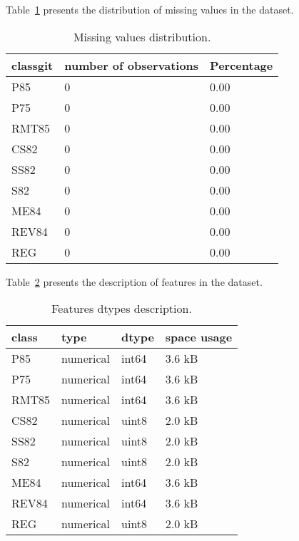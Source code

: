 \documentclass{article}%
\begin{document}
%
Table~\ref{tab:missing_values} %
presents the distribution of missing values in the dataset.%


\begin{table}[H]%
\begin{center}%
\renewcommand{\arraystretch}{1.5}%
\begin{tabular}{l l l}%
\hline%
\textbf{classgit}&\textbf{number of observations}&\textbf{Percentage}\\%
\hline%
P85&0&0.00\\%
P75&0&0.00\\%
RMT85&0&0.00\\%
CS82&0&0.00\\%
SS82&0&0.00\\%
S82&0&0.00\\%
ME84&0&0.00\\%
REV84&0&0.00\\%
REG&0&0.00\\%
\hline%
\end{tabular}%
\end{center}%
\caption{Missing values distribution.}%
\label{tab:missing_values}%
\end{table}

%
Table~\ref{tab:features_dtypes} %
presents the description of features in the dataset.%


\begin{table}[H]%
\begin{center}%
\renewcommand{\arraystretch}{1.5}%
\begin{tabular}{l l l l}%
\hline%
\textbf{class}&\textbf{type}&\textbf{dtype}&\textbf{space usage}\\%
\hline%
P85&numerical&int64&3.6 kB\\%
P75&numerical&int64&3.6 kB\\%
RMT85&numerical&int64&3.6 kB\\%
CS82&numerical&uint8&2.0 kB\\%
SS82&numerical&uint8&2.0 kB\\%
S82&numerical&uint8&2.0 kB\\%
ME84&numerical&int64&3.6 kB\\%
REV84&numerical&int64&3.6 kB\\%
REG&numerical&uint8&2.0 kB\\%
\hline%
\end{tabular}%
\end{center}%
\caption{Features dtypes description.}%
\label{tab:features_dtypes}%
\end{table}
\end{document}
